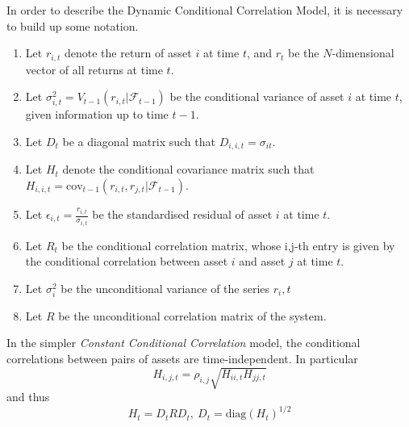 \documentclass{article} %
\numberwithin{equation}{section} %
\numberwithin{figure}{section} %
\numberwithin{table}{section} %
\begin{document}
In order to describe the Dynamic Conditional Correlation Model, it is necessary to build up some notation.
\begin{enumerate}
  \item Let $r_{i,t}$ denote the return of asset $i$ at time $t$, and $r_t$ be the $N$-dimensional vector of all returns at time $t$.
  \item Let $\sigma_{i,t}^2 = V_{t-1}(r_{i,t} | \mathcal{F}_{t-1})$ be the conditional variance of asset $i$ at time $t$, given information up to time $t-1$.
  \item Let $D_t$ be a diagonal matrix such that $D_{i,i,t} = \sigma_{it}$.
  \item Let $H_t$ denote the conditional covariance matrix such that $H_{i,i,t} = \text{cov}_{t-1}(r_{i,t}, r_{j,t} | \mathcal{F}_{t-1})$.
  \item Let $\epsilon_{i,t} = \frac{r_{i,t}}{\sigma_{i,t}}$ be the standardised residual of asset $i$ at time $t$.
  \item Let $R_t$ be the conditional correlation matrix, whose i,j-th entry is given by the conditional correlation between asset $i$ and asset $j$ at time $t$.
  \item Let $\sigma_i^2$ be the unconditional variance of the series $r_i,t$
  \item Let $R$ be the unconditional correlation matrix of the system.
\end{enumerate}


In the simpler \emph{Constant Conditional Correlation} model, the conditional correlations between pairs of assets are time-independent. In particular
\begin{equation}
  H_{i,j,t} = \rho_{i,j}\sqrt{H_{ii,t}H_{jj,t}}
\end{equation}
and thus
\begin{equation}
H_t = D_tRD_t, \ D_t = \text{diag}(H_t)^{1/2}
\end{equation}
\end{document}
